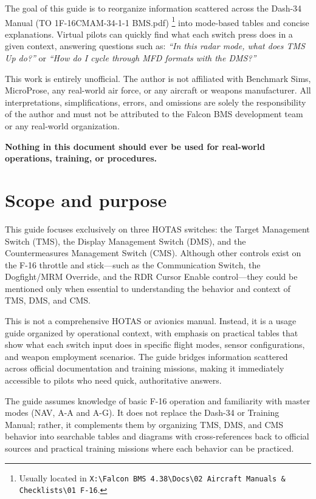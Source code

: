 \documentclass[11pt, a4paper, twoside]{report}
\begin{document}
The goal of this guide is to reorganize information scattered across the Dash-34 Manual (TO 1F-16CMAM-34-1-1 BMS.pdf) \footnote{Usually located in \texttt{X:\textbackslash Falcon BMS 4.38\textbackslash Docs\textbackslash02 Aircraft Manuals \& Checklists\textbackslash 01 F-16}.} into mode-based tables and concise explanations. Virtual pilots can quickly find what each switch press does in a given context, answering questions such as: \emph{``In this radar mode, what does TMS Up do?''} or \emph{``How do I cycle through MFD formats with the DMS?''}

This work is entirely unofficial. The author is not affiliated with Benchmark Sims, MicroProse, any real-world air force, or any aircraft or weapons manufacturer. All interpretations, simplifications, errors, and omissions are solely the responsibility of the author and must not be attributed to the Falcon BMS development team or any real-world organization.

\textbf{Nothing in this document should ever be used for real-world operations, training, or procedures.}

\section{Scope and purpose}
\label{sec:C1-S1}

This guide focuses exclusively on three HOTAS switches: the Target Management Switch (TMS), the Display Management Switch (DMS), and the Countermeasures Management Switch (CMS). Although other controls exist on the F-16 throttle and stick---such as the Communication Switch, the Dogfight/MRM Override, and the RDR Cursor Enable control---they could be mentioned only when essential to understanding the behavior and context of TMS, DMS, and CMS.

This is not a comprehensive HOTAS or avionics manual. Instead, it is a usage guide organized by operational context, with emphasis on practical tables that show what each switch input does in specific flight modes, sensor configurations, and weapon employment scenarios. The guide bridges information scattered across official documentation and training missions, making it immediately accessible to pilots who need quick, authoritative answers.

The guide assumes knowledge of basic F-16 operation and familiarity with master modes (NAV, A-A and A-G). It does not replace the Dash-34 or Training Manual; rather, it complements them by organizing TMS, DMS, and CMS behavior into searchable tables and diagrams with cross-references back to official sources and practical training missions where each behavior can be practiced.
\end{document}
